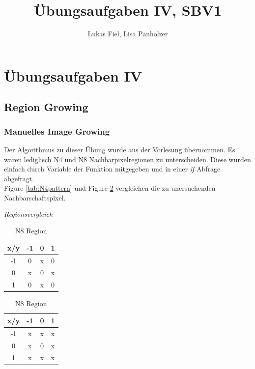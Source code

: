 \documentclass[12pt,german]{article}
\begin{document}
\title{Übungsaufgaben IV, SBV1 }
\author{Lukas Fiel, Lisa Panholzer}
\maketitle


\newpage
\section{Übungsaufgaben IV}
\subsection{Region Growing}

\subsubsection{Manuelles Image Growing}
\label{subsec:manualRegionGrowing}
Der Algorithmus zu dieser Übung wurde aus der Vorlesung übernommen. Es waren lediglisch N4 und N8 Nachbarpixelregionen zu unterscheiden. Diese wurden einfach durch Variable der Funktion mitgegeben und in einer \textit{if} Abfrage abgefragt. \\
Figure \ref{tab:N4pattern} und Figure \ref{tab:N8pattern} vergleichen die zu unersuchenden Nachbarschaftspixel.

\textit{Regionsvergleich}

\begin{table}[H]
  \centering
  \begin{tabular}{| c | c  c  c |}
    \hline
    x/y & -1 & 0 & 1 \\
    \hline
    -1  & 0 & x & 0 \\
    0   & x & 0 & x \\
    1   & 0 & x & 0 \\
    \hline
  \end{tabular}
  \caption{N4 Region}
  \label{tab:N4pattern}

  \hspace{1cm}

  \begin{tabular}{| c | c  c  c |}
    \hline
    x/y & -1 & 0 & 1 \\
    \hline
    -1  & x & x & x \\
    0   & x & 0 & x \\
    1   & x & x & x \\
  \hline
  \end{tabular}
  \caption{N8 Region}
  \label{tab:N8pattern}
\end{table}
\end{document}
